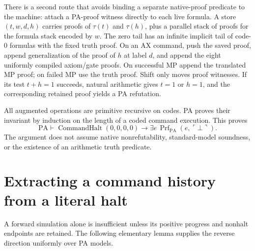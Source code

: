 \documentclass[11pt]{article}
\newcommand{\PA}{\mathrm{PA}}
\newcommand{\Prf}{\operatorname{Prf}}
\newcommand{\tr}{\tau}
\begin{document}
There is a second route that avoids binding a separate native-proof
predicate to the machine: attach a PA-proof witness directly to
each live formula.  A store $(t,w,d,h)$ carries proofs of
$\tr(t)$ and $\tr(h)$, plus a parallel stack of proofs for the
formula stack encoded by $w$.  The zero tail has an infinite implicit
tail of code-$0$ formulas with the fixed truth proof.  On an AX
command, push the saved proof, append generalization of the proof
of $h$ at label $d$, and append the eight uniformly compiled
axiom/gate proofs.  On successful MP append the translated MP
proof; on failed MP use the truth proof.  Shift only moves proof
witnesses.  If its test $t+h=1$ succeeds, natural arithmetic gives
$t=1$ or $h=1$, and the corresponding retained proof yields a PA
refutation.

All augmented operations are primitive recursive on codes.  PA
proves their invariant by induction on the length of a coded
command execution.  This proves
\[
 \PA\vdash
 \operatorname{CommandHalt}(0,0,0,0)\to
 \exists e\,\Prf_{\PA}(e,\ulcorner\bot\urcorner).
\]
The argument does not assume native nonrefutability, standard-model
soundness, or the existence of an arithmetic truth predicate.

\section{Extracting a command history from a literal halt}

A forward simulation alone is insufficient unless its positive
progress and nonhalt endpoints are retained.  The following elementary
lemma supplies the reverse direction uniformly over PA models.
\end{document}
